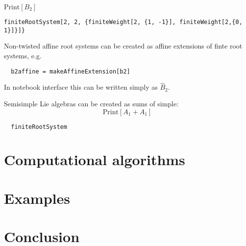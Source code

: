 \documentclass[preprint,12pt]{elsarticle}
\begin{document}
$\mathrm{Print}\left[B_2\right]$
\begin{lstlisting}
finiteRootSystem[2, 2, {finiteWeight[2, {1, -1}], finiteWeight[2,{0, 1}]}]}
\end{lstlisting}

Non-twisted affine root systems can be created as affine extensions of finte root systems, e.g.
\begin{lstlisting}
  b2affine = makeAffineExtension[b2]
\end{lstlisting}
In notebook interface this can be written simply as $\hat{B}_2$. 

Semisimple Lie algebras can be created as sums of simple:
\begin{equation*}
  \mathrm{Print}[A_1+A_1]
\end{equation*}
\begin{lstlisting}
  finiteRootSystem
\end{lstlisting}

\section{Computational algorithms}
\label{sec:comp-algor}

\section{Examples}
\label{sec:examples}

\section{Conclusion}
\label{sec:conclusion}














\end{document}
